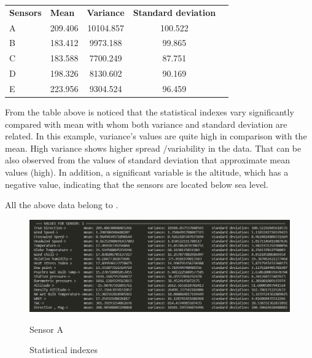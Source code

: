 \documentclass[a4paper]{article}
\begin{document}
        \begin{table}[H]
        \centering
            \begin{tabular}{lcccl}
            
            \textbf{Sensors} & \multicolumn{1}{l}{\textbf{Mean}} & \multicolumn{1}{l}{\textbf{Variance}} & \multicolumn{1}{l}{\textbf{Standard deviation}} &  \\
            A                & 209.406                           & 10104.857                             & 100.522                                         &  \\
            B                & 183.412                           & 9973.188                              & 99.865                                          &  \\
            C                & 183.588                           & 7700.249                              & 87.751                                          &  \\
            D                & 198.326                           & 8130.602                              & 90.169                                          &  \\
            E                & 223.956                           & 9304.524                              & 96.459                                          & 
            \end{tabular}
        \end{table}

        From the table above is noticed that the statistical indexes vary significantly compared with mean with whom both variance and standard deviation are related.
        In this example, variance’s values are quite high in comparison with the mean. High variance shows higher spread /variability in the data. That can be also observed from the values of standard deviation that approximate mean values (high). In addition, a significant variable is the altitude, which has a negative value, indicating that the sensors are located below sea level.

        All the above data belong to \cite{Maiullari2020}.

        \begin{figure}[H]
            \centering
            \includegraphics[width=\textwidth]{images/sensor_1.PNG}
            \caption{Sensor A}
            \caption{Statistical indexes}
            
        \end{figure}
\end{document}
